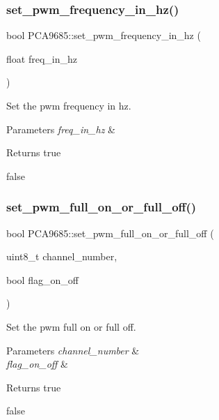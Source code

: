\subsubsection{\texorpdfstring{set\+\_\+pwm\+\_\+frequency\+\_\+in\+\_\+hz()}{set\_pwm\_frequency\_in\_hz()}}
{\footnotesize\ttfamily bool P\+C\+A9685\+::set\+\_\+pwm\+\_\+frequency\+\_\+in\+\_\+hz (\begin{DoxyParamCaption}\item[{float}]{freq\+\_\+in\+\_\+hz }\end{DoxyParamCaption})}



Set the pwm frequency in hz. 


\begin{DoxyParams}{Parameters}
{\em freq\+\_\+in\+\_\+hz} & \\
\hline
\end{DoxyParams}
\begin{DoxyReturn}{Returns}
true 

false 
\end{DoxyReturn}
\mbox{\label{class_p_c_a9685_adaaf3ea65a4a6bfccda3455b7018a86f}} 
\subsubsection{\texorpdfstring{set\+\_\+pwm\+\_\+full\+\_\+on\+\_\+or\+\_\+full\+\_\+off()}{set\_pwm\_full\_on\_or\_full\_off()}}
{\footnotesize\ttfamily bool P\+C\+A9685\+::set\+\_\+pwm\+\_\+full\+\_\+on\+\_\+or\+\_\+full\+\_\+off (\begin{DoxyParamCaption}\item[{uint8\+\_\+t}]{channel\+\_\+number,  }\item[{bool}]{flag\+\_\+on\+\_\+off }\end{DoxyParamCaption})}



Set the pwm full on or full off. 


\begin{DoxyParams}{Parameters}
{\em channel\+\_\+number} & \\
\hline
{\em flag\+\_\+on\+\_\+off} & \\
\hline
\end{DoxyParams}
\begin{DoxyReturn}{Returns}
true 

false 
\end{DoxyReturn}
\mbox{\label{class_p_c_a9685_a7c43c790dced7ac4f9b23217386f9897}} 
